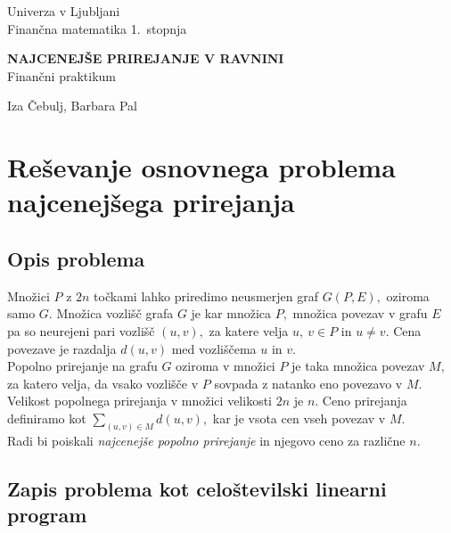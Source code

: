 \documentclass[a4paper, 11pt]{article}
\newcommand{\program}{Finančna matematika 1.~stopnja} %
\newcommand{\imeavtorja}{Iza Čebulj, Barbara Pal} %
\newcommand{\naslovdela}{Najcenejše prirejanje v ravnini}
\newcommand{\letnica}{2022}
\newcommand{\predmet}{Finančni praktikum}
\begin{document}
\thispagestyle{empty}
\begin{center}
\begin{minipage}{0.75\linewidth}
    \centering
    {\Large Univerza v Ljubljani \\ \program}
    \\
    \vspace{3cm}

    {\uppercase{\Large \textbf{\naslovdela}}} \\ \predmet\\
    \vspace{3cm}

    {\Large \imeavtorja\par}
    \vspace{9cm}

\end{minipage}
\end{center}

\noindent{\large
Ljubljana, \letnica}
\pagebreak

\thispagestyle{empty}
\tableofcontents
\pagebreak

\section{Reševanje osnovnega problema najcenejšega prirejanja}
\subsection{Opis problema}
Množici $P$ z $2n$ točkami lahko priredimo neusmerjen graf $G(P,E),$ oziroma samo $G.$
Množica vozlišč grafa $G$ je kar množica $P,$ množica povezav v grafu $E$ pa so neurejeni pari vozlišč $(u,v),$ za katere velja $u,~v \in P$ in $u \neq v.$ 
Cena povezave je razdalja $d(u,v)$ med vozliščema $u$ in $v.$ \\
Popolno prirejanje na grafu $G$ oziroma v množici $P$ je taka množica povezav $M,$ za katero velja, da vsako vozlišče v $P$ sovpada z natanko eno povezavo v $M$.
Velikost popolnega prirejanja v množici velikosti $2n$ je $n.$ 
Ceno prirejanja definiramo kot $\sum_{(u,v) \in M} d(u,v),$ kar je vsota cen vseh povezav v $M.$ \\
Radi bi poiskali \emph{najcenejše popolno prirejanje} in njegovo ceno za različne $n.$

\subsection{Zapis problema kot celoštevilski linearni program}
\end{document}
